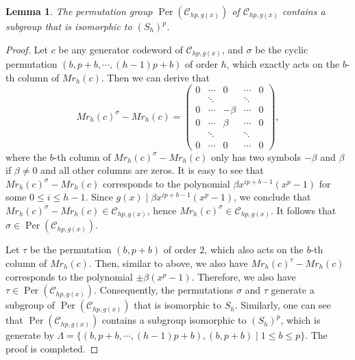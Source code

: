 \documentclass[journal,12pt,onecolumn]{IEEEtran}
\newtheorem{lemma}{Lemma}
\begin{document}
 
\begin{lemma}\label{L_hp_row}
    The permutation group $\operatorname{Per}(\mathcal{C}_{hp,g(x)})$ of $\mathcal{C}_{hp,g(x)}$ contains a subgroup that is isomorphic to $(S_h)^p$. 
\end{lemma}
\begin{proof}
    Let $c$ be any generator codeword of $\mathcal{C}_{hp,g(x)}$, and $\sigma$ be the cyclic permutation $(b,p+b,\cdots,(h-1)p+b)$ of order $h$, which exactly acts on the $b$-th column of $Mr_{h}(c)$. Then we can derive that 
    \[
        Mr_{h}(c)^\sigma - Mr_{h}(c) = \begin{pmatrix}
            0 & \cdots & 0 & \cdots & 0 \\
              & \ddots &   & \ddots &   \\
            0 & \cdots & -\beta & \cdots & 0 \\
            0 & \cdots & \beta & \cdots & 0 \\
              & \ddots &   & \ddots &   \\
            0 & \cdots & 0 & \cdots & 0 
        \end{pmatrix},
    \]
    where the $b$-th column of $Mr_{h}(c)^\sigma - Mr_{h}(c)$ only has two symbols $-\beta$ and $\beta$ if $\beta\neq 0$ and all other columns are zeros. It is easy to see that $Mr_{h}(c)^\sigma - Mr_{h}(c)$ corresponds to the polynomial $\beta x^{ip+b-1}(x^p-1)$ for some $0\le i\le h-1$. Since $g(x)\mid \beta x^{ip+b-1}(x^p-1)$, we conclude that $Mr_{h}(c)^\sigma - Mr_{h}(c)\in \mathcal{C}_{hp,g(x)}$, hence $Mr_{h}(c)^\sigma\in \mathcal{C}_{hp,g(x)}$. It follows that $\sigma\in \operatorname{Per}(\mathcal{C}_{hp,g(x)})$. 

    Let $\tau$ be the permutation $(b,p+b)$ of order $2$, which also acts on the $b$-th column of $Mr_{h}(c)$. Then, similar to above, we also have $Mr_{h}(c)^\tau - Mr_{h}(c)$ corresponds to the polynomial $\pm\beta(x^p-1)$. Therefore, we also have $\tau\in \operatorname{Per}(\mathcal{C}_{hp,g(x)})$. Consequently, the permutations $\sigma$ and $\tau$ generate a subgroup of $\operatorname{Per}(\mathcal{C}_{hp,g(x)})$ that is isomorphic to $S_h$. Similarly, one can see that $\operatorname{Per}(\mathcal{C}_{hp,g(x)})$ contains a subgroup isomorphic to $(S_h)^p$, which is generate by $\Lambda = \{(b,p+b,\cdots,(h-1)p+b),(b,p+b)\mid 1\le b\le p\}$. The proof is completed.
\end{proof}
\end{document}

